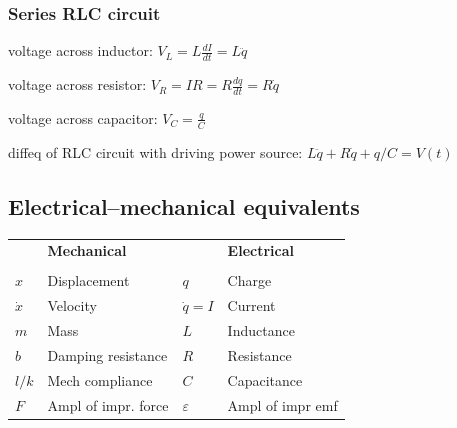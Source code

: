 \documentclass[letterpaper,landscape,10pt]{article}
\newenvironment{mydescription}
{\begin{description}
	\setlength{\itemsep}{0pt}
	\setlength{\parskip}{0pt}
	\setlength{\parsep}{-1pt}}
{\end{description}}
\begin{document}
{\begin{multicols}{4}
    
    \subsubsection*{Series RLC circuit}
    	\begin{mydescription}
    		\item[voltage across inductor:]
    			$V_L = L \frac{dI}{dt} = L\ddot{q}$  \\
    		\item[voltage across resistor:]
    			$V_R = IR = R\frac{dq}{dt} = R\dot{q}$  \\
    		\item[voltage across capacitor:]
    			$V_C = \frac{q}{C}$  \\
    		\item[diffeq of RLC circuit with driving power source:]
    			$L\ddot{q} + R\dot{q} + q/C = V(t)$  \\
    	\end{mydescription}
   
    \subsection*{Electrical--mechanical equivalents}
    	\begin{tabular}{l l l l}
    		& \textbf{Mechanical} & & \textbf{Electrical} \\[3pt]
    		\\[3pt]
    		$x$       & Displacement            & $q$           & Charge \\
    		[3pt]
    		$\dot{x}$ & Velocity                & $\dot{q}=I$   & Current \\
    		[3pt]
    		$m$		  & Mass                    & $L$           & Inductance \\
    		[3pt]
    		$b$		  & Damping resistance 		& $R$			& Resistance \\
    		[3pt]
    		$l/k$	  & Mech compliance 	& $C$			& Capacitance \\
    		[3pt]
    		$F$		  & Ampl of impr. force & $\varepsilon$ & Ampl of impr emf
    	\end{tabular}


\end{multicols}}
\end{document}
